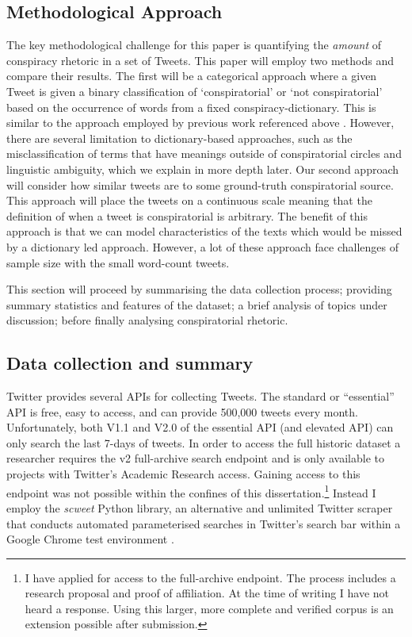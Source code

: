 \documentclass[11pt]{article}
\begin{document}
\subsection{Methodological Approach} \label{Subsection: Methodological Approach}

The key methodological challenge for this paper is quantifying the \textit{amount} of conspiracy rhetoric in a set of Tweets. This paper will employ two methods and compare their results. The first will be a categorical approach where a given Tweet is given a binary classification of `conspiratorial' or `not conspiratorial' based on the occurrence of words from a fixed conspiracy-dictionary. This is similar to the approach employed by previous work referenced above \citep{jackson2021qanon, ahmed2020covid}. However, there are several limitation to dictionary-based approaches, such as the misclassification of terms that have meanings outside of conspiratorial circles and linguistic ambiguity, which we explain in more depth later. Our second approach will consider how similar tweets are to some ground-truth conspiratorial source. This approach will place the tweets on a continuous scale meaning that the definition of when a tweet is conspiratorial is arbitrary. The benefit of this approach is that we can model characteristics of the texts which would be missed by a dictionary led approach. However, a lot of these approach face challenges of sample size with the small word-count tweets.

This section will proceed by summarising the data collection process; providing summary statistics and features of the dataset; a brief analysis of topics under discussion; before finally analysing conspiratorial rhetoric.

\subsection{Data collection and summary} \label{Subsection: Data collection and summary}

Twitter provides several APIs for collecting Tweets. The standard or ``essential'' API is free, easy to access, and can provide 500,000 tweets every month. Unfortunately, both V1.1 and V2.0 of the essential API (and elevated API) can only search the last 7-days of tweets. In order to access the full historic dataset a researcher requires the v2 full-archive search endpoint and is only available to projects with Twitter's Academic Research access. Gaining access to this endpoint was not possible within the confines of this dissertation.\footnote{I have applied for access to the full-archive endpoint. The process includes a research proposal and proof of affiliation. At the time of writing I have not heard a response. Using this larger, more complete and verified corpus is an extension possible after submission.} Instead I employ the \textit{scweet} Python library, an alternative and unlimited Twitter scraper that conducts automated parameterised searches in Twitter's search bar within a Google Chrome test environment \citep{scweet}.
\end{document}
